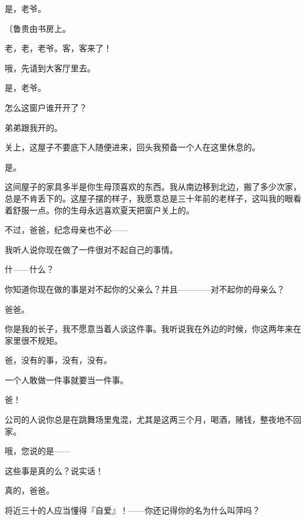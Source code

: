 是，老爷。

{\fangsong〔鲁贵由书房上。}

老，老，老爷。客，客来了！

哦，先请到大客厅里去。

是，老爷。

怎么这窗户谁开开了？

弟弟跟我开的。

关上，这屋子不要底下人随便进来，回头我预备一个人在这里休息的。

是。

这间屋子的家具多半是你生母顶喜欢的东西。我从南边移到北边，搬了多少次家，总是不肯丢下的。这屋子摆的样子，我愿意总是三十年前的老样子，这叫我的眼看着舒服一点。你的生母永远喜欢夏天把窗户关上的。

不过，爸爸，纪念母亲也不必——

我听人说你现在做了一件很对不起自己的事情。

什——什么？

你知道你现在做的事是对不起你的父亲么？并且————对不起你的母亲么？

爸爸。

你是我的长子，我不愿意当着人谈这件事。我听说我在外边的时候，你这两年来在家里很不规矩。

爸，没有的事，没有，没有。

一个人敢做一件事就要当一件事。

爸！

公司的人说你总是在跳舞场里鬼混，尤其是这两三个月，喝酒，赌钱，整夜地不回家。

哦，您说的是——

这些事是真的么？说实话！

真的，爸爸。

将近三十的人应当懂得『自爱』！——你还记得你的名为什么叫萍吗？

